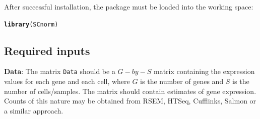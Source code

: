 \documentclass{article}\usepackage[]{graphicx}\usepackage[usenames,dvipsnames]{color}
\makeatletter
\newcommand{\hlstd}[1]{\textcolor[rgb]{0.345,0.345,0.345}{#1}}%
\newcommand{\hlkwd}[1]{\textcolor[rgb]{0.737,0.353,0.396}{\textbf{#1}}}%
\newenvironment{kframe}{%
 \def\at@end@of@kframe{}%
 \ifinner\ifhmode%
  \def\at@end@of@kframe{\end{minipage}}%
  \begin{minipage}{\columnwidth}%
 \fi\fi%
 \def\FrameCommand##1{\hskip\@totalleftmargin \hskip-\fboxsep
 \colorbox{shadecolor}{##1}\hskip-\fboxsep
     \hskip-\linewidth \hskip-\@totalleftmargin \hskip\columnwidth}%
 \MakeFramed {\advance\hsize-\width
   \@totalleftmargin\z@ \linewidth\hsize
   \@setminipage}}%
 {\par\unskip\endMakeFramed%
 \at@end@of@kframe}
\newenvironment{knitrout}{}{} %
\makeatother
\begin{document}
After successful installation, the package must be loaded into the working space:
\begin{knitrout}
\color{fgcolor}\begin{kframe}
\begin{alltt}
  \hlkwd{library}\hlstd{(SCnorm)}
\end{alltt}


{\ttfamily\noindent\itshape\color{messagecolor}{\#\# Loading required package: parallel}}

{\ttfamily\noindent\itshape\color{messagecolor}{\#\# Loading required package: quantreg}}

{\ttfamily\noindent\itshape\color{messagecolor}{\#\# Loading required package: SparseM}}

{\ttfamily\noindent\itshape\color{messagecolor}{\#\# \\\#\# Attaching package: 'SparseM'}}

{\ttfamily\noindent\itshape\color{messagecolor}{\#\# The following object is masked from 'package:base':\\\#\# \\\#\#\ \ \ \  backsolve}}

{\ttfamily\noindent\itshape\color{messagecolor}{\#\# Loading required package: cluster}}

{\ttfamily\noindent\itshape\color{messagecolor}{\#\# Loading required package: moments}}

{\ttfamily\noindent\itshape\color{messagecolor}{\#\# Loading required package: reshape2}}

{\ttfamily\noindent\itshape\color{messagecolor}{\#\# Loading required package: ggplot2}}\end{kframe}
\end{knitrout}
  
  \subsection{Required inputs}
\label{sec:startgenedeinput}
\begin{flushleft}
{\bf Data}:  The matrix \verb+Data+ should be a $G-by-S$ matrix
containing the expression values for each gene and each cell,
where $G$ is the number of genes and $S$ is the number of cells/samples. The matrix should contain
estimates of gene expression. Counts of this nature may be obtained from RSEM, HTSeq, Cufflinks, Salmon or a similar approach.
\end{flushleft}
\end{document}
